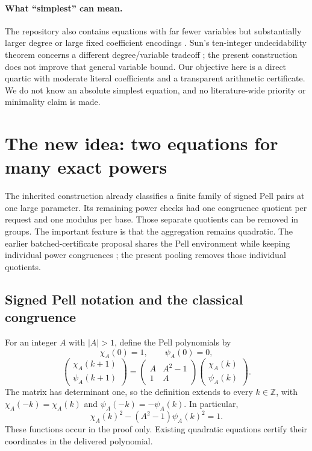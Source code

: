 \documentclass[11pt,letterpaper]{article}
\theoremstyle{definition}\newtheorem{definition}[theorem]{Definition}
\theoremstyle{remark}\newtheorem{remark}[theorem]{Remark}
\newcommand{\Z}{\mathbb Z}\newcommand{\N}{\mathbb N}
\begin{document}
\paragraph{What ``simplest'' can mean.}
The repository also contains equations with far fewer variables but
substantially larger degree or large fixed coefficient encodings
\cite{forms}. Sun's ten-integer undecidability theorem concerns a different
degree/variable tradeoff \cite{sun}; the present construction does not
improve that general variable bound. Our objective here is a direct
quartic with moderate literal coefficients and a transparent arithmetic
certificate. We do not know an absolute simplest equation, and no
literature-wide priority or minimality claim is made.

\section{The new idea: two equations for many exact powers}
\label{sec:pool}

The inherited construction already classifies a finite family of signed
Pell pairs at one large parameter. Its remaining power checks had one
congruence quotient per request and one modulus per base. Those separate
quotients can be removed in groups. The important feature is that the
aggregation remains quadratic. The earlier batched-certificate proposal
shares the Pell environment while keeping individual power congruences
\cite{batched}; the present pooling removes those individual quotients.

\subsection{Signed Pell notation and the classical congruence}

For an integer \(A\) with \(|A|>1\), define the Pell polynomials by
\[
\chi_A(0)=1,\qquad\psi_A(0)=0,
\]
\[
\begin{pmatrix}\chi_A(k+1)\\\psi_A(k+1)\end{pmatrix}
=\begin{pmatrix}A&A^2-1\\1&A\end{pmatrix}
 \begin{pmatrix}\chi_A(k)\\\psi_A(k)\end{pmatrix}.
\]
The matrix has determinant one, so the definition extends to every
\(k\in\Z\), with \(\chi_A(-k)=\chi_A(k)\) and
\(\psi_A(-k)=-\psi_A(k)\). In particular,
\[
\chi_A(k)^2-(A^2-1)\psi_A(k)^2=1.
\]
These functions occur in the proof only. Existing quadratic equations
certify their coordinates in the delivered polynomial.
\end{document}
